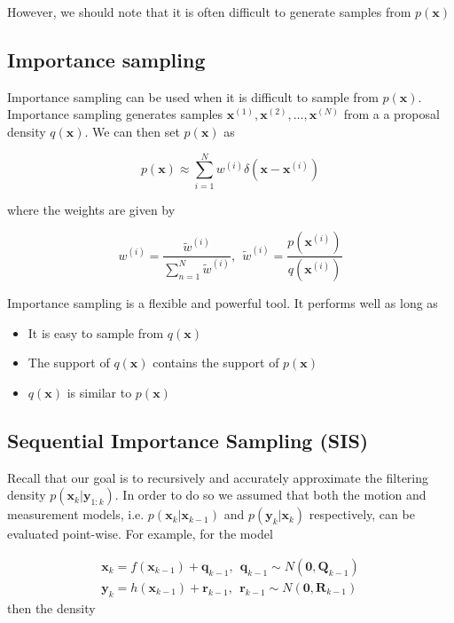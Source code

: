 However, we should note that it is often difficult to generate samples from $p(\mathbf{x})$

\subsection{Importance sampling}
\label{importance_sampling}

Importance sampling can be used when it is difficult to sample from $p(\mathbf{x})$. Importance sampling generates samples
$\mathbf{x}^{(1)}, \mathbf{x}^{(2)}, \ldots, \mathbf{x}^{(N)}$ from a a proposal density $q(\mathbf{x})$. We can then set $p(\mathbf{x})$ as

\begin{equation}
p(\mathbf{x}) \approx \sum_{i=1}^N w^{(i)} \delta (\mathbf{x} -\mathbf{x}^{(i)})
\end{equation} 

where the weights are given by

\begin{equation}
w^{(i)} = \frac{\tilde{w}^{(i)}}{\sum_{n=1}^N \tilde{w}^{(i)}}, ~~ \tilde{w}^{(i)} = \frac{p(\mathbf{x}^{(i)})}{q(\mathbf{x}^{(i)})}
\end{equation}

Importance sampling is a flexible and powerful tool. It performs well as long as

\begin{itemize}
\item It is easy to sample from $q(\mathbf{x})$
\item The support of $q(\mathbf{x})$ contains the support of $p(\mathbf{x})$
\item $q(\mathbf{x})$ is similar to $p(\mathbf{x})$
\end{itemize}

\subsection{Sequential Importance Sampling (SIS)}
\label{sequential_importance_sampling}

Recall that our goal is to recursively and accurately approximate the filtering density $p(\mathbf{x}_k | \mathbf{y}_{1:k})$.
In order to do so we assumed that both the motion and measurement models, i.e. $p(\mathbf{x}_k | \mathbf{x}_{k-1})$ and $p(\mathbf{y}_k | \mathbf{x}_{k})$
respectively, can be evaluated point-wise. For example, for the model 

\begin{eqnarray}
\mathbf{x}_k = f(\mathbf{x}_{k-1}) + \mathbf{q}_{k-1}, ~~ \mathbf{q}_{k-1} \sim N(\mathbf{0}, \mathbf{Q}_{k-1}) \\
\mathbf{y}_k = h(\mathbf{x}_{k-1}) + \mathbf{r}_{k-1}, ~~ \mathbf{r}_{k-1} \sim N(\mathbf{0}, \mathbf{R}_{k-1}) 
\end{eqnarray}
then the density 

